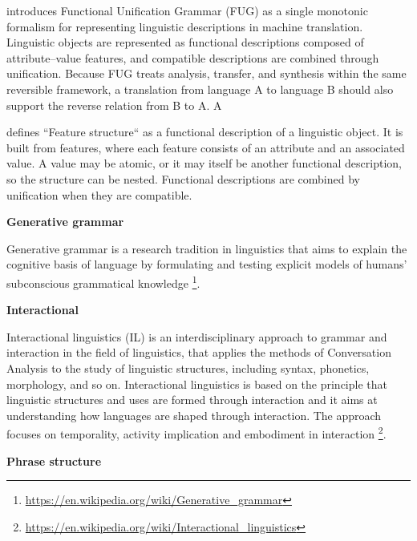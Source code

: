 \documentclass{book}
\providecommand{\ProjectDeepHeading}[2]{%
    \par\medskip\noindent\textbf{#2}\par\smallskip
}
\providecommand{\seeherefooter}[1]{\footnote{\url{#1}}}
\begin{document}
    \cite{kay-1984-functional-unification-grammar} introduces Functional Unification Grammar (FUG) as a single monotonic formalism for representing linguistic descriptions in machine translation. Linguistic objects are represented as functional descriptions composed of attribute--value features, and compatible descriptions are combined through unification. Because FUG treats analysis, transfer, and synthesis within the same reversible framework, a translation from language A to language B should also support the reverse relation from B to A. A
    
    \cite{kay-1984-functional-unification-grammar} defines ``Feature structure`` as a functional description of a linguistic object. It is built from features, where each feature consists of an attribute and an associated value. A value may be atomic, or it may itself be another functional description, so the structure can be nested. Functional descriptions are combined by unification when they are compatible.

\ProjectDeepHeading{6}{Generative grammar}


Generative grammar is a research tradition in linguistics that aims to explain the cognitive basis of language by formulating and testing explicit models of humans' subconscious grammatical knowledge \seeherefooter{https://en.wikipedia.org/wiki/Generative_grammar}.

\ProjectDeepHeading{6}{Interactional}


Interactional linguistics (IL) is an interdisciplinary approach to grammar and interaction in the field of linguistics, that applies the methods of Conversation Analysis to the study of linguistic structures, including syntax, phonetics, morphology, and so on. Interactional linguistics is based on the principle that linguistic structures and uses are formed through interaction and it aims at understanding how languages are shaped through interaction. The approach focuses on temporality, activity implication and embodiment in interaction \seeherefooter{https://en.wikipedia.org/wiki/Interactional_linguistics}.
%    
%

\ProjectDeepHeading{6}{Phrase structure}
\end{document}
